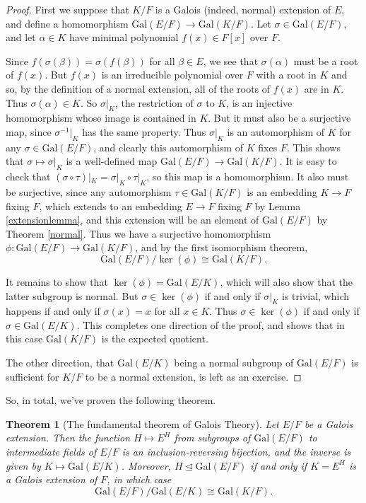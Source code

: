 \documentclass[12pt]{report}
\newtheorem{thm}{Theorem}[section]
\theoremstyle{definition}
\def\aa{\alpha}
\def\bb{\beta}
\def\Gal{\text{Gal}}
\begin{document}
\begin{proof}
    First we suppose that $K/F$ is a Galois (indeed, normal) extension of $E$, and define a homomorphism $\Gal(E/F) \to  \Gal(K/F)$. Let $\sigma\in \Gal(E/F)$, and let $\aa\in K$ have minimal polynomial $f(x)\in F[x]$ over $F$.

    Since $f(\sigma(\bb)) = \sigma(f(\bb))$ for all $\bb\in E$, we see that $\sigma(\aa)$ must be a root of $f(x)$. But $f(x)$ is an irreducible polynomial over $F$ with a root in $K$ and so, by the definition of a normal extension, all of the roots of $f(x)$ are in $K$. Thus $\sigma(\aa)\in K$. So $\sigma|_K$, the restriction of $\sigma$ to $K$, is an injective homomorphism whose image is contained in $K$. But it must also be a surjective map, since $\sigma^{-1}|_K$ has the same property. Thus $\sigma|_K$ is an automorphism of $K$ for any $\sigma\in \Gal(E/F)$, and clearly this automorphism of $K$ fixes $F$. This shows that $\sigma \mapsto \sigma|_K$ is a well-defined map $\Gal(E/F) \to  \Gal(K/F)$. It is easy to check that $(\sigma \circ \tau )|_K = \sigma|_K \circ \tau|_K$, so this map is a homomorphism. It also must be surjective, since any automorphism $\tau\in \Gal(K/F)$ is an embedding $K \to  F$ fixing $F$, which extends to an embedding $E \to  F$ fixing $F$ by Lemma \ref{extensionlemma}, and this extension will be an element of $\Gal(E/F)$ by Theorem \ref{normal}. Thus we have a surjective homomorphism $\phi: \Gal(E/F) \to  \Gal(K/F)$, and by the first isomorphism theorem,
    $$ \Gal(E/F)/\ker(\phi)\cong \Gal(K/F).$$

    It remains to show that $\ker(\phi) = \Gal(E/K)$, which will also show that the latter subgroup is normal. But $\sigma\in \ker(\phi)$ if and only if $\sigma|_K$ is trivial, which happens if and only if $\sigma(x) = x$ for all $x\in K$. Thus $\sigma\in \ker(\phi)$ if and only if $\sigma\in \Gal(E/K)$. This completes one direction of the proof, and shows that in this case $\Gal(K/F)$ is the expected quotient.

    The other direction, that $\Gal(E/K)$ being a normal subgroup of $\Gal(E/F)$ is sufficient for $K/F$ to be a normal extension, is left as an exercise.
\end{proof}

So, in total, we've proven the following theorem.

\begin{thm}[The fundamental theorem of Galois Theory]\label{galois}
    Let $E/F$ be a Galois extension. Then the function $H \mapsto E^H$ from subgroups of $\Gal(E/F)$ to intermediate fields of $E/F$ is an inclusion-reversing bijection, and the inverse is given by $K \mapsto \Gal(E/K)$. Moreover, $H \trianglelefteq \Gal(E/F)$ if and only if $K = E^H$ is a Galois extension of $F$, in which case $$\Gal(E/F)/\Gal(E/K) \cong \Gal(K/F).$$
\end{thm}
\end{document}
